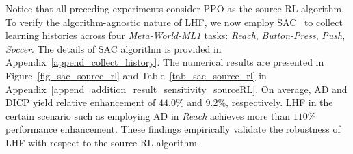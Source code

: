 \documentclass{article}
\begin{document}
Notice that all preceding experiments consider PPO as the source RL algorithm. To verify the algorithm-agnostic nature of LHF, we now employ SAC~\cite{haarnoja2018soft} to collect learning histories across four \textit{Meta-World-ML1} tasks: \textit{Reach}, \textit{Button-Press}, \textit{Push}, \textit{Soccer}. The details of SAC algorithm is provided in Appendix~\ref{append_collect_history}.
%
The numerical results are presented in Figure~\ref{fig_sac_source_rl} and Table~\ref{tab_sac_source_rl} in Appendix~\ref{append_addition_result_sensitivity_sourceRL}. 
%
%
On average, AD and DICP yield relative enhancement of $44.0\%$ and $9.2\%$, respectively. LHF in the certain scenario such as employing AD in \textit{Reach} achieves more than $110\%$ performance enhancement. These findings empirically validate the robustness of LHF with respect to the source RL algorithm.
\end{document}
